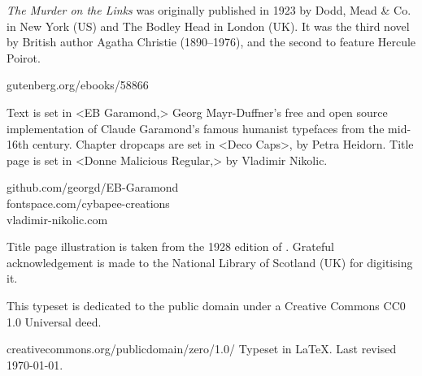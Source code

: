 \documentclass[
paper=5.5in:8.5in,
]{scrbook} %
\begin{document}
\centering
\begin{minipage}{\textwidth}
\textit{The Murder on the Links}  was originally published in 1923 by Dodd, Mead \& Co. in New York (US) and The Bodley Head in London (UK).  It was the third novel by British author Agatha Christie (1890--1976), and the second to feature Hercule Poirot.
\end{minipage}
\vfill
gutenberg.org/ebooks/58866
\vfill
\divider
\vfill
\begin{minipage}{\textwidth}
Text is set in <EB Garamond,> Georg Mayr-Duffner's free and open source implementation of Claude Garamond’s famous humanist typefaces from the mid-16th century.  Chapter dropcaps are set in <Deco Caps>, by Petra Heidorn. Title page is set in <Donne Malicious Regular,> by Vladimir Nikolic.
\end{minipage}
\vfill
 github.com/georgd/EB-Garamond\\fontspace.com/cybapee-creations\\vladimir-nikolic.com
 \vfill
\divider
\vfill
\begin{minipage}{\textwidth}
Title page illustration is taken from the 1928 edition of . Grateful acknowledgement is made to the National Library of Scotland (UK) for digitising it.
\end{minipage}
\vfill
\divider
\vfill
\begin{minipage}{\textwidth}
This typeset is dedicated to the public domain under a Creative Commons CC0 1.0 Universal deed. 
\end{minipage}
\vfill
creativecommons.org/publicdomain/zero/1.0/
\vfill
\divider
\vfill
Typeset in \LaTeX{}. Last revised \today.
\thispagestyle{empty}
\end{document}
